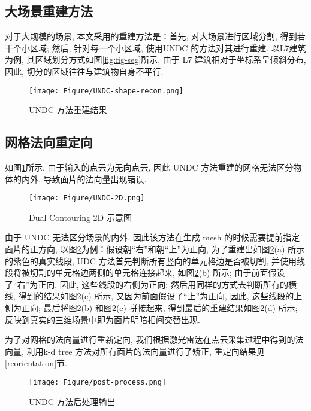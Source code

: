 \subsection{大场景重建方法}
对于大规模的场景, 本文采用的重建方法是：首先, 对大场景进行区域分割, 得到若干个小区域; 然后, 针对每一个小区域, 使用UNDC 的方法对其进行重建. 以L7建筑为例, 其区域划分方式如图\ref{fig:fig-seg}所示, 由于 L7 建筑相对于坐标系呈倾斜分布, 因此, 切分的区域往往与建筑物自身不平行. 

\begin{figure}[H]
	\center
	\texttt{[image: Figure/UNDC-shape-recon.png]}
	\centering
	\caption{UNDC 方法重建结果}\label{fig:fig-shape-recon}
\end{figure}

\subsection{网格法向重定向}
如图\ref{fig:fig-shape-recon}所示, 由于输入的点云为无向点云, 因此 UNDC 方法重建的网格无法区分物体的内外, 导致面片的法向量出现错误. 

\begin{figure}[H]
	\center
	\texttt{[image: Figure/UNDC-2D.png]}
	\centering
	\caption{Dual Contouring 2D 示意图}\label{fig:fig-2D-UNDC}
\end{figure}

由于 UNDC 无法区分场景的内外, 因此该方法在生成 mesh 的时候需要提前指定面片的正方向, 以图\ref{fig:fig-2D-UNDC}为例：假设朝“右”和朝“上”为正向, 为了重建出如图\ref{fig:fig-2D-UNDC}(a) 所示的紫色的真实线段, UDC 方法首先判断所有竖向的单元格边是否被切割, 并使用线段将被切割的单元格边两侧的单元格连接起来, 如图\ref{fig:fig-2D-UNDC}(b) 所示; 由于前面假设了“右”为正向, 因此, 这些线段的右侧为正向; 然后用同样的方式去判断所有的横线, 得到的结果如图\ref{fig:fig-2D-UNDC}(c) 所示, 又因为前面假设了“上”为正向, 因此, 这些线段的上侧为正向; 最后将图\ref{fig:fig-2D-UNDC}(b) 和图\ref{fig:fig-2D-UNDC}(c) 拼接起来, 得到最后的重建结果如图\ref{fig:fig-2D-UNDC}(d) 所示; 反映到真实的三维场景中即为面片明暗相间交替出现. 

为了对网格的法向量进行重新定向, 我们根据激光雷达在点云采集过程中得到的法向量, 利用k-d tree 方法对所有面片的法向量进行了矫正, 重定向结果见\ref{reorientation}节. 

\begin{figure}[H]
	\center
	\texttt{[image: Figure/post-process.png]}
	\centering
	\caption{UNDC 方法后处理输出}\label{fig:fig-post}
\end{figure}

